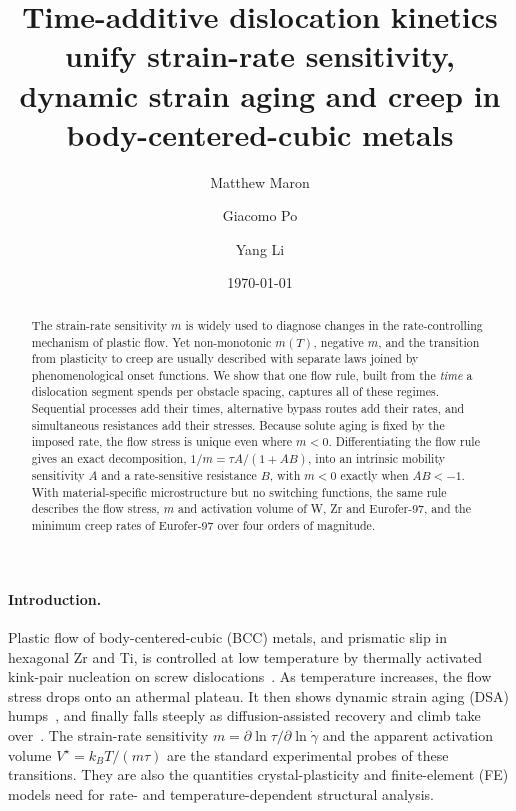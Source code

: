 \documentclass[aps,prl,twocolumn,superscriptaddress,amsmath,amssymb,floatfix]{revtex4-2}
\newcommand{\gd}{\dot\gamma}
\newcommand{\kT}{k_BT}
\newcommand{\todo}[1]{\textcolor{red}{[#1]}}
\begin{document}
\title{Time-additive dislocation kinetics unify strain-rate sensitivity, dynamic strain aging and creep in body-centered-cubic metals}

\author{Matthew Maron}
\affiliation{\todo{Affiliation}}
\author{Giacomo Po}
\affiliation{\todo{Affiliation}}
\author{Yang Li}
\affiliation{\todo{Affiliation}}

\date{\today}

\begin{abstract}
The strain-rate sensitivity $m$ is widely used to diagnose changes in the rate-controlling mechanism of plastic flow. Yet non-monotonic $m(T)$, negative $m$, and the transition from plasticity to creep are usually described with separate laws joined by phenomenological onset functions. We show that one flow rule, built from the \emph{time} a dislocation segment spends per obstacle spacing, captures all of these regimes. Sequential processes add their times, alternative bypass routes add their rates, and simultaneous resistances add their stresses. Because solute aging is fixed by the imposed rate, the flow stress is unique even where $m<0$. Differentiating the flow rule gives an exact decomposition, $1/m=\tau A/(1+AB)$, into an intrinsic mobility sensitivity $A$ and a rate-sensitive resistance $B$, with $m<0$ exactly when $AB<-1$. With material-specific microstructure but no switching functions, the same rule describes the flow stress, $m$ and activation volume of W, Zr and Eurofer-97, and the minimum creep rates of Eurofer-97 over four orders of magnitude.
\end{abstract}

\maketitle

\paragraph{Introduction.}
Plastic flow of body-centered-cubic (BCC) metals, and prismatic slip in hexagonal Zr and Ti, is controlled at low temperature by thermally activated kink-pair nucleation on screw dislocations~\cite{HirthLothe,Po2016}. As temperature increases, the flow stress drops onto an athermal plateau. It then shows dynamic strain aging (DSA) humps~\cite{Cheng2001,KubinEstrin1990}, and finally falls steeply as diffusion-assisted recovery and climb take over~\cite{FrostAshby}. The strain-rate sensitivity $m=\partial\ln\tau/\partial\ln\gd$ and the apparent activation volume $V^\star=\kT/(m\tau)$ are the standard experimental probes of these transitions. They are also the quantities crystal-plasticity and finite-element (FE) models need for rate- and temperature-dependent structural analysis.
\end{document}
